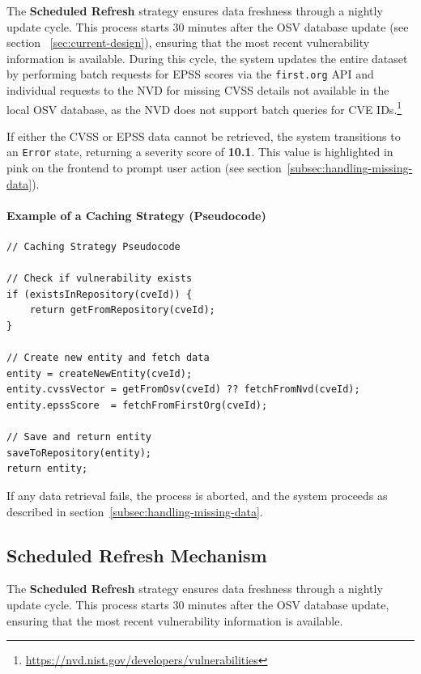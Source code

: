 The \textbf{Scheduled Refresh} strategy ensures data freshness through a nightly update cycle. This process starts 30 minutes after the \ac{OSV} database update (see section ~\ref{sec:current-design}), ensuring that the most recent vulnerability information is available. During this cycle, the system updates the entire dataset by performing batch requests for \ac{EPSS} scores via the \texttt{first.org} \ac{API} and individual requests to the \ac{NVD} for missing \ac{CVSS} details not available in the local \ac{OSV} database, as the \ac{NVD} does not support batch queries for \ac{CVE} IDs.\footnote{\url{https://nvd.nist.gov/developers/vulnerabilities}}

If either the \ac{CVSS} or \ac{EPSS} data cannot be retrieved, the system transitions to an \texttt{Error} state, returning a severity score of \textbf{10.1}. This value is highlighted in pink on the frontend to prompt user action (see section~\ref{subsec:handling-missing-data}).

\noindent
\paragraph{Example of a Caching Strategy (Pseudocode)}
\label{par:example-caching-strategy}

\begin{verbatim}
// Caching Strategy Pseudocode

// Check if vulnerability exists
if (existsInRepository(cveId)) {
    return getFromRepository(cveId);
}

// Create new entity and fetch data
entity = createNewEntity(cveId);
entity.cvssVector = getFromOsv(cveId) ?? fetchFromNvd(cveId);
entity.epssScore  = fetchFromFirstOrg(cveId);

// Save and return entity
saveToRepository(entity);
return entity;
\end{verbatim}

\noindent
If any data retrieval fails, the process is aborted, and the system proceeds as described in section~\ref{subsec:handling-missing-data}.

\subsection{Scheduled Refresh Mechanism}
\label{subsec:scheduled-refresh}

The \textbf{Scheduled Refresh} strategy ensures data freshness through a nightly update cycle. This process starts 30 minutes after the \ac{OSV} database update, ensuring that the most recent vulnerability information is available.

